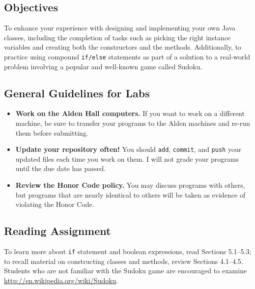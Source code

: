 


\vspace{-0.2in}
\subsection*{Objectives}
\vspace{-0.05in}

To enhance your experience with designing and implementing your own Java classes, including the completion of tasks such
as picking the right instance variables and creating both the constructors and the methods.  Additionally, to practice
using compound {\tt if/else} statements as part of a solution to a real-world problem involving a popular and well-known
game called Sudoku.

\vspace{-0.15in}
\subsection*{General Guidelines for Labs}
\vspace{-0.05in}
\begin{itemize}
\item
{\bf Work on the Alden Hall computers.} If you want to work on a different
machine, be sure to transfer your programs to the Alden
machines and re-run them before submitting.
\item
  {\bf Update your repository often!} You should {\tt add}, {\tt commit},
  and {\tt push} your updated files each time you work on them.  I will not grade
your programs until the due date has passed.
\item
{\bf Review the Honor Code policy.} You
may discuss programs with others, but programs that are nearly identical
to others will be taken as evidence of violating the Honor Code.
\end{itemize}

\vspace{-0.15in}
\subsection*{Reading Assignment}
\vspace{-0.05in}

To learn more about {\tt if} statement and boolean expressions, read Sections 5.1--5.3; to recall material on
constructing classes and methods, review Sections 4.1--4.5.  Students who are not familiar with the Sudoku game are
encouraged to examine \url{http://en.wikipedia.org/wiki/Sudoku}.

